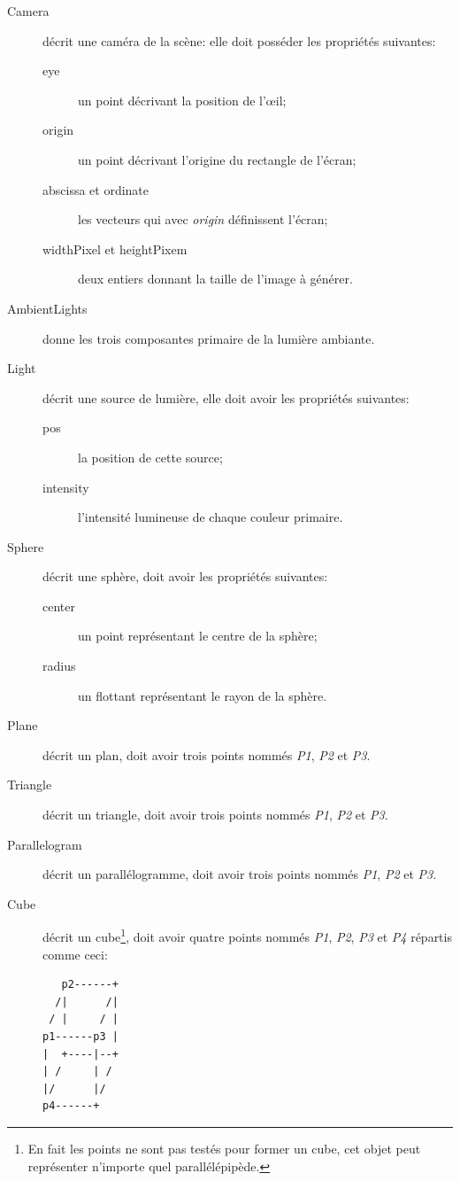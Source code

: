 \documentclass[a4paper]{article}
\begin{document}
    \begin{description}
      \item[Camera] décrit une caméra de la scène: elle doit posséder les
        propriétés suivantes:
        \begin{description}
          \item[eye] un point décrivant la position de l'œil;
          \item[origin] un point décrivant l'origine du rectangle de l'écran;
          \item[abscissa et ordinate] les vecteurs qui avec \textit{origin}
            définissent l'écran;
          \item[widthPixel et heightPixem] deux entiers donnant la taille de
            l'image à générer. 
        \end{description}
      \item[AmbientLights] donne les trois composantes primaire de la lumière
        ambiante.
      \item[Light] décrit une source de lumière, elle doit avoir les propriétés
        suivantes:
        \begin{description}
          \item[pos] la position de cette source;
          \item[intensity] l'intensité lumineuse de chaque couleur primaire.
        \end{description}
      \item[Sphere] décrit une sphère, doit avoir les propriétés suivantes:
        \begin{description}
          \item[center] un point représentant le centre de la sphère;
          \item[radius] un flottant représentant le rayon de la sphère.
        \end{description}
      \item[Plane] décrit un plan, doit avoir trois points nommés \textit{P1},
        \textit{P2} et \textit{P3}.
      \item[Triangle] décrit un triangle, doit avoir trois points nommés
        \textit{P1}, \textit{P2} et \textit{P3}.
      \item[Parallelogram] décrit un parallélogramme, doit avoir trois points
        nommés \textit{P1}, \textit{P2} et \textit{P3}.
      \item[Cube] décrit un cube\footnote{En fait les points ne sont pas testés
        pour former un cube, cet objet peut représenter n'importe quel
        parallélépipède.}, doit avoir quatre points nommés
        \textit{P1}, \textit{P2}, \textit{P3} et \textit{P4} répartis comme
        ceci: \begin{lstlisting}
   p2------+
  /|      /|
 / |     / |
p1------p3 |
|  +----|--+
| /     | /
|/      |/
p4------+
        \end{lstlisting}
    \end{description}
\end{document}
